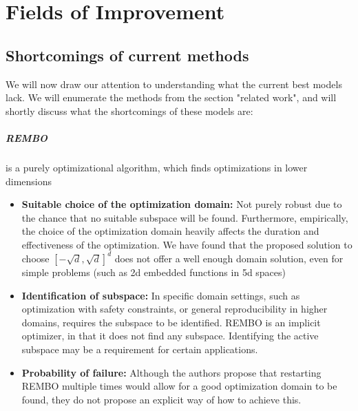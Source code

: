 \chapter{Fields of Improvement}

\ifpdf
    \graphicspath{{Chapter3/Figs/Raster/}{Chapter3/Figs/PDF/}{Chapter3/Figs/}}
\else
    \graphicspath{{Chapter3/Figs/Vector/}{Chapter3/Figs/}}
\fi

\section{Shortcomings of current methods}
We will now draw our attention to understanding what the current best models lack.
We will enumerate the methods from the section "related work", and will shortly discuss what the shortcomings of these models are:

\paragraph{REMBO} is a purely optimizational algorithm, which finds optimizations in lower dimensions
\begin{itemize}
\item \textbf{Suitable choice of the optimization domain:} Not purely robust due to the chance that no suitable subspace will be found. 
Furthermore, empirically, the choice of the optimization domain heavily affects the duration and effectiveness of the optimization.
We have found that the proposed solution to choose $ \left[ -\sqrt{d}, \sqrt{d}  \right]^d $ does not offer a well enough domain solution, even for simple problems (such as 2d embedded functions in 5d spaces)
\item \textbf{Identification of subspace:} In specific domain settings, such as optimization with safety constraints, or general reproducibility in higher domains, requires the subspace to be identified. 
REMBO is an implicit optimizer, in that it does not find any subspace.
Identifying the active subspace may be a requirement for certain applications.
\item \textbf{Probability of failure:} Although the authors propose that restarting REMBO multiple times would allow for a good optimization domain to be found, they do not propose an explicit way of how to achieve this.
\end{itemize}

